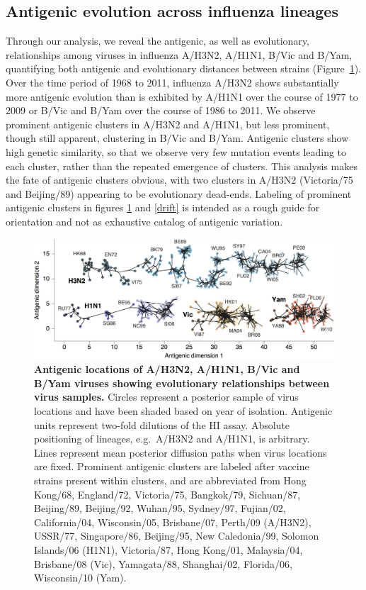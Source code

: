 \documentclass[11pt,oneside,letterpaper]{article}
\begin{document}
\subsection*{Antigenic evolution across influenza lineages}

Through our analysis, we reveal the antigenic, as well as evolutionary, relationships among viruses in influenza A/H3N2, A/H1N1, B/Vic and B/Yam, quantifying both antigenic and evolutionary distances between strains (Figure~\ref{map}).
Over the time period of 1968 to 2011, influenza A/H3N2 shows substantially more antigenic evolution than is exhibited by A/H1N1 over the course of 1977 to 2009 or B/Vic and B/Yam over the course of 1986 to 2011.
We observe prominent antigenic clusters in A/H3N2 and A/H1N1, but less prominent, though still apparent, clustering in B/Vic and B/Yam.
Antigenic clusters show high genetic similarity, so that we observe very few mutation events leading to each cluster, rather than the repeated emergence of clusters.
This analysis makes the fate of antigenic clusters obvious, with two clusters in A/H3N2 (Victoria/75 and Beijing/89) appearing to be evolutionary dead-ends.
Labeling of prominent antigenic clusters in figures \ref{map} and \ref{drift} is intended as a rough guide for orientation and not as exhaustive catalog of antigenic variation.

\begin{figure}[h]
	\centering		
	\includegraphics[width=1.0\textwidth]{figures/map}
	\caption{\textbf{Antigenic locations of A/H3N2, A/H1N1, B/Vic and B/Yam viruses showing evolutionary relationships between virus samples.} 
	Circles represent a posterior sample of virus locations and have been shaded based on year of isolation.
	Antigenic units represent two-fold dilutions of the HI assay.
	Absolute positioning of lineages, e.g.\ A/H3N2 and A/H1N1, is arbitrary.
	Lines represent mean posterior diffusion paths when virus locations are fixed.
	Prominent antigenic clusters are labeled after vaccine strains present within clusters, and are abbreviated from Hong Kong/68, England/72, Victoria/75, Bangkok/79, Sichuan/87, Beijing/89, Beijing/92, Wuhan/95, Sydney/97, Fujian/02, California/04, Wisconsin/05, Brisbane/07, Perth/09 (A/H3N2), USSR/77, Singapore/86, Beijing/95, New Caledonia/99, Solomon Islands/06 (H1N1), Victoria/87, Hong Kong/01, Malaysia/04, Brisbane/08 (Vic), Yamagata/88, Shanghai/02, Florida/06, Wisconsin/10 (Yam).} 
	\label{map} 
\end{figure}
\end{document}
